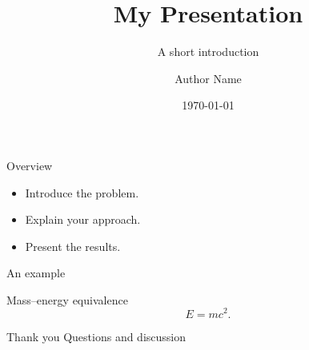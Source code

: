 \documentclass[aspectratio=169]{beamer}
\title{My Presentation}
\subtitle{A short introduction}
\author{Author Name}
\date{\today}
\begin{document}
\begin{frame}
  \titlepage
\end{frame}

\begin{frame}{Overview}
  \begin{itemize}
    \item Introduce the problem.
    \item Explain your approach.
    \item Present the results.
  \end{itemize}
\end{frame}

\begin{frame}{An example}
  \begin{block}{Mass--energy equivalence}
    \[
      E = mc^2.
    \]
  \end{block}
\end{frame}

\begin{frame}{Thank you}
  \centering Questions and discussion
\end{frame}
\end{document}
